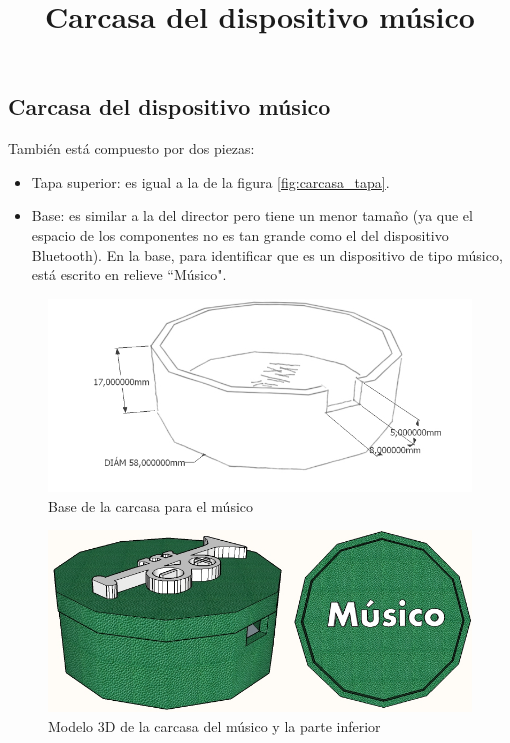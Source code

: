 \subsection{Carcasa del dispositivo músico}
\title{Carcasa del dispositivo músico}

También está compuesto por dos piezas:
\begin{itemize}
  \item Tapa superior: es igual a la de la figura \ref{fig:carcasa_tapa}.
  \item Base: es similar a la del director pero tiene un menor tamaño (ya que el espacio
  de los componentes no es tan grande como el del dispositivo Bluetooth). En la base,
  para identificar que es un dispositivo de tipo músico, está escrito en relieve ``Músico".
\end{itemize}


\begin{figure}[!htb]
\centering
\includegraphics[width=1\textwidth]{./imagenes/carcasa_base_musico}
\caption{Base de la carcasa para el músico} \label{fig:carcasa_base_musico}
\end{figure}

\begin{figure}[!htb]
\centering
\includegraphics[width=1\textwidth]{./imagenes/carcasa_modelo_musico}
\caption{Modelo 3D de la carcasa del músico y la parte inferior} \label{fig:carcasa_musico}
\end{figure}
